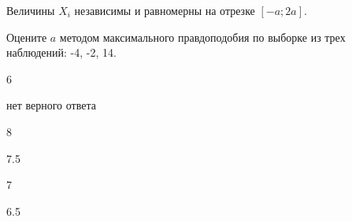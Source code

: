 
\begin{question}
Величины \(X_i\) независимы и равномерны на отрезке \([-a;2a]\).

Оцените \(a\) методом максимального правдоподобия по выборке из трех
наблюдений: -4, -2, 14.
\begin{answerlist}
  \item 6
  \item нет верного ответа
  \item 8
  \item 7.5
  \item 7
  \item 6.5
\end{answerlist}
\end{question}


